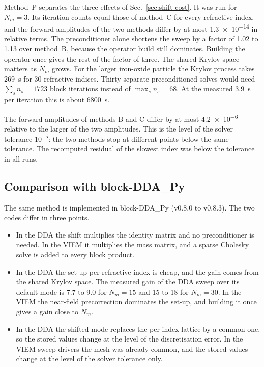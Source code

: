 \documentclass[11pt,a4paper]{article}
\begin{document}
Method~P separates the three effects of Sec.~\ref{sec:shift-cost}.
It was run for $N_m = 3$.
Its iteration counts equal those of method~C for every refractive
index, and the forward amplitudes of the two methods differ by at most
\num{1.3e-14} in relative terms.
The preconditioner alone shortens the sweep by a factor of 1.02 to
1.13 over method~B, because the operator build still dominates.
Building the operator once gives the rest of the factor of three.
The shared Krylov space matters as $N_m$ grows.
For the larger iron-oxide particle the Krylov process takes
\SI{269}{\second} for 30 refractive indices.
Thirty separate preconditioned solves would need $\sum_s n_s = 1723$
block iterations instead of $\max_s n_s = 68$.
At the measured \SI{3.9}{\second} per iteration this is about
\SI{6800}{\second}.

The forward amplitudes of methods B and C differ by at most
\num{4.2e-6} relative to the larger of the two amplitudes.
This is the level of the solver tolerance $10^{-5}$: the two methods
stop at different points below the same tolerance.
The recomputed residual of the slowest index was below the tolerance in
all runs.

\subsection{Comparison with block-DDA\_Py}
\label{sec:shift-vs-dda}

The same method is implemented in block-DDA\_Py (v0.8.0 to v0.8.3).
The two codes differ in three points.
\begin{itemize}
  \item In the DDA the shift multiplies the identity matrix and no
        preconditioner is needed.
        In the VIEM it multiplies the mass matrix, and a sparse
        Cholesky solve is added to every block product.
  \item In the DDA the set-up per refractive index is cheap, and the
        gain comes from the shared Krylov space.
        The measured gain of the DDA sweep over its default mode is
        7.7 to 9.0 for $N_m = 15$ and 15 to 18 for $N_m = 30$.
        In the VIEM the near-field precorrection dominates the set-up,
        and building it once gives a gain close to $N_m$.
  \item In the DDA the shifted mode replaces the per-index lattice by a
        common one, so the stored values change at the level of the
        discretisation error.
        In the VIEM sweep drivers the mesh was already common, and the
        stored values change at the level of the solver tolerance only.
\end{itemize}
\end{document}
